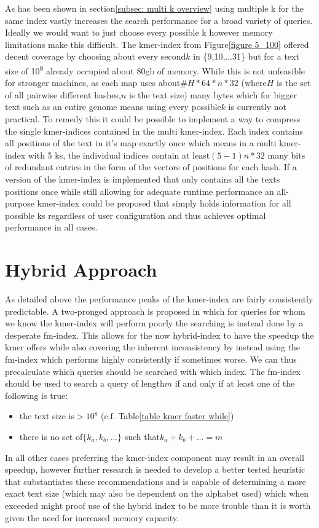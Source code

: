 As has been shown in section\ref{subsec: multi k overview} using
multiple k for the same index vastly increases the search performance
for a broad variety of queries. Ideally we would want to just choose
every possible k however memory limitations make this difficult. The
kmer-index from Figure\ref{figure 5_100} offered decent coverage
by choosing about every second$k$ in \{9,10,...31\} but for a text
size of 10\textsuperscript{8} already occupied about 80gb of memory.
While this is not unfeasible for stronger machines, as each map uses
about$\#H*64*n*32$ (where$H$ is the set of all pairwise different
hashes,$n$ is the text size) many bytes which for bigger text such
as an entire genome means using every possible$k$ is currently not
practical. To remedy this it could be possible to implement a way
to compress the single kmer-indices contained in the multi kmer-index.
Each index contains all positions of the text in it's map exactly
once which means in a multi kmer-index with 5 ks, the individual indices
contain at least$(5-1)n*32$ many bits of redundant entries in the
form of the vectors of positions for each hash. If a version of the
kmer-index is implemented that only contains all the texts positions
once while still allowing for adequate runtime performance an all-purpose
kmer-index could be proposed that simply holds information for all
possible ks regardless of user configuration and thus achieves optimal
performance in all cases.

\section{Hybrid Approach}

As detailed above the performance peaks of the kmer-index are fairly
consistently predictable. A two-pronged approach is proposed in which
for queries for whom we know the kmer-index will perform poorly the
searching is instead done by a desperate fm-index. This allows for
the now hybrid-index to have the speedup the kmer offers while also
covering the inherent inconsistency by instead using the fm-index
which performs highly consistently if sometimes worse. We can thus
precalculate which queries should be searched with which index. The
fm-index should be used to search a query of length$m$ if and only
if at least one of the following is true:
\begin{itemize}
\item the text size is$>10{{}^8}$ (c.f. Table\ref{table kmer faster while})
\item there is no set of$\{k_{a},k_{b},...\}$ such that$k_{a}+k_{b}+...=m$
\end{itemize}
In all other cases preferring the kmer-index component may result
in an overall speedup, however further research is needed to develop
a better tested heuristic that substantiates these recommendations
and is capable of determining a more exact text size (which may also
be dependent on the alphabet used) which when exceeded might proof
use of the hybrid index to be more trouble than it is worth given
the need for increased memory capacity.

